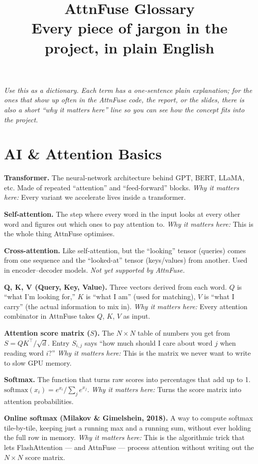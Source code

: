 \documentclass[11pt]{article}
\title{\textbf{AttnFuse Glossary}\\[4pt]
       \large Every piece of jargon in the project, in plain English}
\author{}
\date{}
\newcommand{\term}[2]{%
  \par\smallskip
  \noindent\textbf{\color{blue!50!black}#1.} #2\par
}
\newcommand{\termw}[3]{%
  \par\smallskip
  \noindent\textbf{\color{blue!50!black}#1.} #2 \emph{\color{black!60}Why it matters here:} #3\par
}
\begin{document}
\maketitle

\noindent\textit{Use this as a dictionary. Each term has a one-sentence plain
explanation; for the ones that show up often in the AttnFuse code, the report,
or the slides, there is also a short ``why it matters here'' line so you can
see how the concept fits into the project.}

\tableofcontents
\bigskip

\section{AI \& Attention Basics}

\termw{Transformer}
{The neural-network architecture behind GPT, BERT, LLaMA, etc. Made of repeated
``attention'' and ``feed-forward'' blocks.}
{Every variant we accelerate lives inside a transformer.}

\termw{Self-attention}
{The step where every word in the input looks at every other word and figures
out which ones to pay attention to.}
{This is the whole thing AttnFuse optimises.}

\term{Cross-attention}
{Like self-attention, but the ``looking'' tensor (queries) comes from one
sequence and the ``looked-at'' tensor (keys/values) from another. Used in
encoder--decoder models. \emph{Not yet supported by AttnFuse.}}

\termw{Q, K, V (Query, Key, Value)}
{Three vectors derived from each word. $Q$ is ``what I'm looking for,''
$K$ is ``what I am'' (used for matching), $V$ is ``what I carry'' (the
actual information to mix in).}
{Every attention combinator in AttnFuse takes $Q$, $K$, $V$ as input.}

\termw{Attention score matrix ($S$)}
{The $N \times N$ table of numbers you get from $S = QK^\top / \sqrt{d}$.
Entry $S_{i,j}$ says ``how much should I care about word $j$ when reading
word $i$?''}
{This is the matrix we never want to write to slow GPU memory.}

\termw{Softmax}
{The function that turns raw scores into percentages that add up to 1.
$\text{softmax}(x_i) = e^{x_i} / \sum_j e^{x_j}$.}
{Turns the score matrix into attention probabilities.}

\termw{Online softmax (Milakov \& Gimelshein, 2018)}
{A way to compute softmax tile-by-tile, keeping just a running max and a
running sum, without ever holding the full row in memory.}
{This is the algorithmic trick that lets FlashAttention --- and AttnFuse ---
process attention without writing out the $N \times N$ score matrix.}
\end{document}
